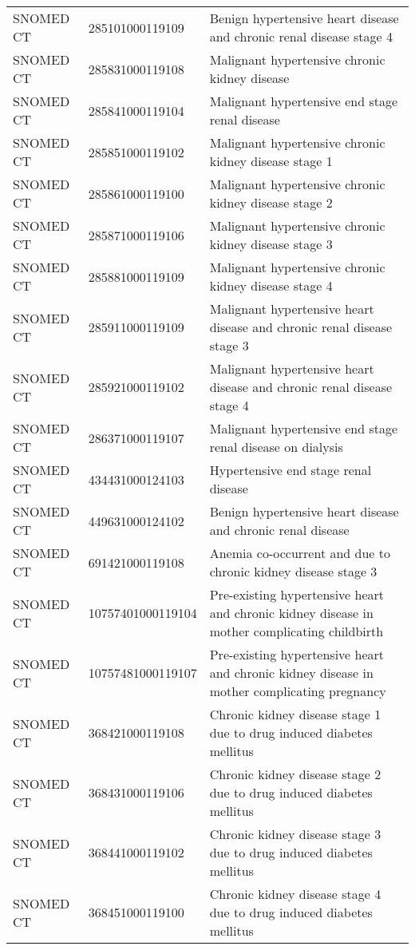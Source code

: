 \begin{table}[ht]
\begin{tabular}{lll}
  SNOMED CT & 285101000119109 & Benign hypertensive heart disease and chronic renal disease stage 4 \\ 
  SNOMED CT & 285831000119108 & Malignant hypertensive chronic kidney disease \\ 
  SNOMED CT & 285841000119104 & Malignant hypertensive end stage renal disease \\ 
  SNOMED CT & 285851000119102 & Malignant hypertensive chronic kidney disease stage 1 \\ 
  SNOMED CT & 285861000119100 & Malignant hypertensive chronic kidney disease stage 2 \\ 
  SNOMED CT & 285871000119106 & Malignant hypertensive chronic kidney disease stage 3 \\ 
  SNOMED CT & 285881000119109 & Malignant hypertensive chronic kidney disease stage 4 \\ 
  SNOMED CT & 285911000119109 & Malignant hypertensive heart disease and chronic renal disease stage 3 \\ 
  SNOMED CT & 285921000119102 & Malignant hypertensive heart disease and chronic renal disease stage 4 \\ 
  SNOMED CT & 286371000119107 & Malignant hypertensive end stage renal disease on dialysis \\ 
  SNOMED CT & 434431000124103 & Hypertensive end stage renal disease \\ 
  SNOMED CT & 449631000124102 & Benign hypertensive heart disease and chronic renal disease \\ 
  SNOMED CT & 691421000119108 & Anemia co-occurrent and due to chronic kidney disease stage 3 \\ 
  SNOMED CT & 10757401000119104 & Pre-existing hypertensive heart and chronic kidney disease in mother complicating childbirth \\ 
  SNOMED CT & 10757481000119107 & Pre-existing hypertensive heart and chronic kidney disease in mother complicating pregnancy \\ 
  SNOMED CT & 368421000119108 & Chronic kidney disease stage 1 due to drug induced diabetes mellitus \\ 
  SNOMED CT & 368431000119106 & Chronic kidney disease stage 2 due to drug induced diabetes mellitus \\ 
  SNOMED CT & 368441000119102 & Chronic kidney disease stage 3 due to drug induced diabetes mellitus \\ 
  SNOMED CT & 368451000119100 & Chronic kidney disease stage 4 due to drug induced diabetes mellitus \\ 

\end{tabular}
\end{table}
